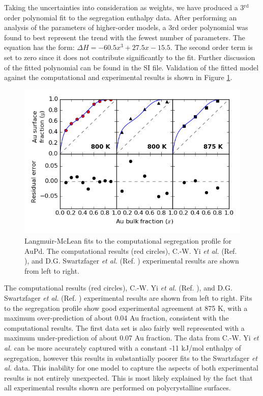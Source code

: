 \documentclass[12pt]{cmuthesis}
\begin{document}
Taking the uncertainties into consideration as weights, we have produced a 3\(^{\text{rd}}\) order polynomial fit to the segregation enthalpy data. After performing an analysis of the parameters of higher-order models, a 3rd order polynomial was found to best represent the trend with the fewest number of parameters. The equation has the form: \(\Delta H = -60.5x^3 + 27.5x - 15.5\). The second order term is set to zero since it does not contribute significantly to the fit. Further discussion of the fitted polynomial can be found in the SI file. Validation of the fitted model against the computational and experimental results is shown in Figure \ref{fig-fit-prediction}.

\begin{figure}[h]
\centering
\includegraphics[width=5in]{./images/fit-prediction.png}
\caption{\label{fig-fit-prediction}
Langmuir-McLean fits to the computational segregation profile for AuPd. The computational results (red circles), C.-W. Yi \emph{et al.} (Ref. ), and D.G. Swartzfager \emph{et al.} (Ref. ) experimental results are shown from left to right.}
\end{figure}

The computational results (red circles), C.-W. Yi \emph{et al.} (Ref. ), and D.G. Swartzfager \emph{et al.} (Ref. ) experimental results are shown from left to right. Fits to the segregation profile show good experimental agreement at 875 K, with a maximum over-prediction of about 0.04 Au fraction, consistent with the computational results. The first data set is also fairly well represented with a maximum under-prediction of about 0.07 Au fraction. The data from C.-W. Yi \emph{et al.} can be more accurately captured with a constant -11 kJ/mol enthalpy of segregation, however this results in substantially poorer fits to the Swartzfager \emph{et al.} data. This inability for one model to capture the aspects of both experimental results is not entirely unexpected. This is most likely explained by the fact that all experimental results shown are performed on polycrystalline surfaces.
\end{document}
